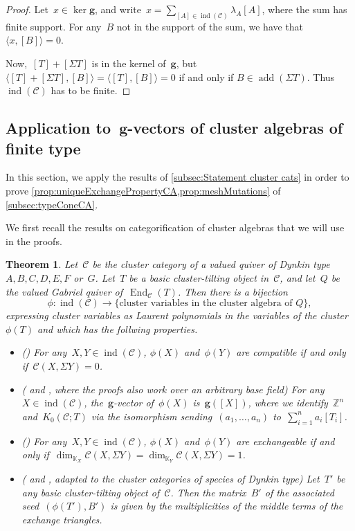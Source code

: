 \documentclass{amsart}
\newtheorem{theorem}{Theorem}[section]
\theoremstyle{definition}
\newcommand{\Z}{\mathbb{Z}} %
\renewcommand{\b}[1]{{\boldsymbol{#1}}} %
\newcommand{\field}{\mathbb{K}}
\newcommand{\cat}{\mathcal{C}}
\newcommand{\susp}{\Sigma}
\newcommand{\add}{\operatorname{add}}
\newcommand{\End}[1]{\operatorname{End}_{#1}}
\newcommand{\ind}{\operatorname{ind}}
\newcommand{\CC}{\phi}
\begin{document}
\begin{proof}
Let~$x \in \ker \b{g}$, and write~$x = \sum_{[A] \in \ind(\cat)} \lambda_A[A]$, where the sum has finite support. For any~$B$ not in the support of the sum, we have that~$\langle x, [B] \rangle = 0$.
 
Now,~$[T]+[\susp T]$ is in the kernel of~$\b{g}$, but~$\langle [T] + [\susp T], [B] \rangle = \langle [T], [B] \rangle = 0$ if and only if ${B \in \add(\susp T)}$. Thus~$\ind(\cat)$ has to be finite.
\end{proof}


\subsection{Application to~$\b{g}$-vectors of cluster algebras of finite type}
\label{sec:applications-g-vectors}

In this section, we apply the results of \cref{subsec:Statement cluster cats} in order to prove \cref{prop:uniqueExchangePropertyCA,prop:meshMutations} of \cref{subsec:typeConeCA}.

We first recall the results on categorification of cluster algebras that we will use in the proofs.
\begin{theorem}
\label{thm:categorification}
Let~$\cat$ be the cluster category of a valued quiver of Dynkin type~$A,B,C,D,E,F$ or~$G$. Let~$T$ be a basic cluster-tilting object in~$\cat$, and let~$Q$ be the valued Gabriel quiver of~$\End{\cat}(T)$. Then there is a bijection
\[
\CC: \ind(\cat) \xrightarrow{} \{\textrm{cluster variables in the cluster algebra of~$Q$}\},
\]
expressing cluster variables as Laurent polynomials in the variables of the cluster~$\CC(T)$ and which has the follwing properties.
\begin{itemize}
\item[(i)] \emph{(}\cite[Prop.~3.2]{BuanMarshReinekeReitenTodorov}\emph{)} For any~$X,Y \in \ind(\cat)$, $\CC(X)$ and~$\CC(Y)$ are compatible if and only if~$\cat(X, \susp Y) = 0$.
\item[(ii)] \emph{(}\cite[Prop.~4.3]{FuKeller} and \cite[Prop.~2.2]{Palu}, where the proofs also work over an arbitrary base field\emph{)} For any~$X \in \ind(\cat)$, the~$\b{g}$-vector of~$\CC(X)$ is~$\b{g}([X])$, where we identify~$\Z^n$ and~$K_0(\cat ; T)$ via the isomorphism sending~$(a_1, \dots, a_n)$ to~$\sum_{i=1}^n a_i [T_i]$.
\item[(iii)] \emph{(}\cite[Thm.~7.5]{BuanMarshReinekeReitenTodorov}\emph{)} For any~$X,Y \in \ind(\cat)$, $\CC(X)$ and~$\CC(Y)$ are exchangeable if and only if~$\dim_{\field_X}\cat(X, \susp Y) = \dim_{\field_Y}\cat(X, \susp Y) = 1$.
\item[(iv)]\emph{(}\cite{BuanIyamaReitenScott} and \cite[Thm.~5.1]{BuanMarshReiten-mutation}, adapted to the cluster categories of species of Dynkin type\emph{)} Let~$T'$ be any basic cluster-tilting object of~$\cat$. Then the matrix~$B'$ of the associated seed~$(\CC(T'),B')$ is given by the multiplicities of the middle terms of the exchange triangles. 
\end{itemize}
\end{theorem}
\end{document}
